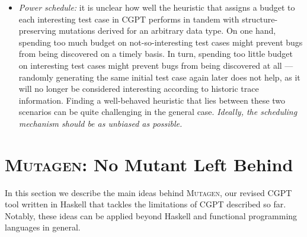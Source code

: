 \documentclass[sigconf,review,anonymous]{acmart}
\newcommand{\mutagen}{\textsc{Mutagen}\xspace}
\begin{document}
\begin{itemize}
\item \emph{Power schedule:}
%
it is unclear how well the heuristic that assigns a budget to each interesting
test case in CGPT performs in tandem with structure-preserving mutations derived
for an arbitrary data type.
%
On one hand, spending too much budget on not-so-interesting test cases might
prevent bugs from being discovered on a timely basis.
%
In turn, spending too little budget on interesting test cases might prevent bugs
from being discovered at all --- randomly generating the same initial test case
again later does not help, as it will no longer be considered interesting
according to historic trace information.
%
Finding a well-behaved heuristic that lies between these two scenarios can be
quite challenging in the general case. 
%
\emph{Ideally, the scheduling mechanism should be as unbiased as possible.}

%

\end{itemize}




\section{\mutagen: No Mutant Left Behind}
\label{sec:mutagen}

In this section we describe the main ideas behind \mutagen, our revised CGPT
tool written in Haskell that tackles the limitations of CGPT described so far.
%
Notably, these ideas can be applied beyond Haskell and functional programming
languages in general.
%
\end{document}
